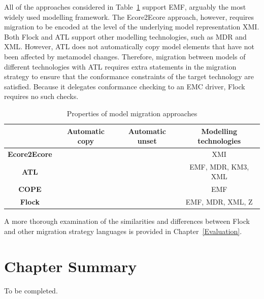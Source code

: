 All of the approaches considered in Table~\ref{tab:differences} support EMF, arguably the most widely used modelling framework. The Ecore2Ecore approach, however, requires migration to be encoded at the level of the underlying model representation XMI. Both Flock and ATL support other modelling technologies, such as MDR and XML. However, ATL does not automatically copy model elements that have not been affected by metamodel changes. Therefore, migration between models of different technologies with ATL requires extra statements in the migration strategy to ensure that the conformance constraints of the target technology are satisfied. Because it delegates conformance checking to an EMC driver, Flock requires no such checks.

\begin{table}[b]
	\caption{Properties of model migration approaches}
	\centering
	\begin{tabular}{|c|c|c|c|}
		\hline
		             & \textbf{Automatic copy} & \textbf{Automatic unset} & \textbf{Modelling technologies} \\
		\hline
		\textbf{Ecore2Ecore}  & \tick             & \cross              & XMI                    \\
		\hline
		\textbf{ATL}          & \cross            & \tick               & EMF, MDR, KM3, XML     \\
		\hline
		\textbf{COPE}         & \tick             & \cross              & EMF                    \\
		\hline
		\textbf{Flock}        & \tick             & \tick               & EMF, MDR, XML, Z       \\
		\hline
	\end{tabular}
	\label{tab:differences}
\end{table}

A more thorough examination of the similarities and differences between Flock and other migration strategy languages is provided in Chapter~\ref{Evaluation}.


\section{Chapter Summary}
To be completed.

